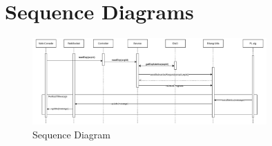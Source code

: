 \newpage
\section{Sequence Diagrams}

\begin{figure}[ht!]
    \centering
    \includegraphics[width=0.8\textwidth]{images/2_analisys/FL_sequence_diagram.png}
    \caption{Sequence Diagram}
    \label{fig:sequence_diagram}
\end{figure}


